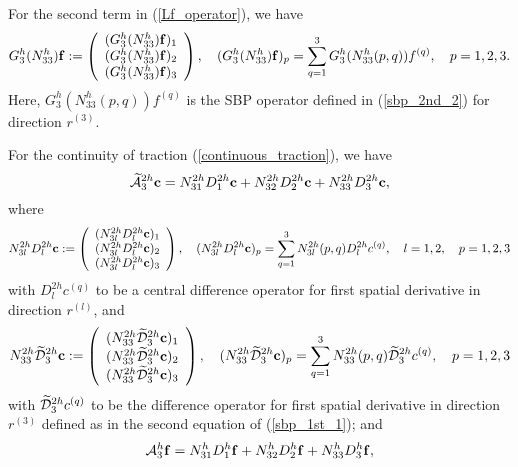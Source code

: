 For the second term in (\ref{Lf_operator}), we have
\begin{align*}\label{3_10_2}
{{G}}_3^{h}({N}_{33}^{h}){\bf f} := \left(\begin{array}{c}
({{G}}_3^{h}({N}_{33}^{h}){\bf f})_1 \\
({{G}}_3^{h}({N}_{33}^{h}){\bf f})_2 \\
({{G}}_3^{h}({N}_{33}^{h}){\bf f})_3 
\end{array}\right), \quad ({{G}}_3^{h}({N}_{33}^{h}){\bf f})_p = \sum_{q = 1}^{3} {G}_3^{h}(N_{33}^{h}(p,q)) {f}^{(q)},\quad p = 1,2,3.
\end{align*}
Here, ${G}_3^{h}(N_{33}^{h}(p,q)) {f}^{(q)}$ is the SBP operator defined in (\ref{sbp_2nd_2}) for direction $r^{(3)}$. 

For the continuity of traction (\ref{continuous_traction}), we have \[\widetilde{\mathcal{A}}^{2h}_3{\bf c} = N_{31}^{2h}D_1^{2h}{\bf c}+N_{32}^{2h}D_2^{2h}{\bf c}+N_{33}^{2h}D_3^{2h}{\bf c},\]
where
\begin{align*}\label{gamma_D} 
{N}_{3l}^{2h}D_l^{2h}{\bf c} := \left(\begin{array}{c}
({N}_{3l}^{2h}D_l^{2h}{\bf c})_1 \\
({N}_{3l}^{2h}D_l^{2h}{\bf c})_2 \\
({N}_{3l}^{2h}D_l^{2h}{\bf c})_3 
\end{array}\right), \quad ({N}_{3l}^{2h}D_l^{2h}{\bf c})_p = \sum_{q = 1}^{3} N_{3l}^{2h}(p,q)D_l^{2h}{c}^{(q)},\quad l = 1,2, \quad p = 1,2,3
\end{align*}
with $D_l^{2h}{c}^{(q)}$ to be a central difference operator for first spatial derivative in direction $r^{(l)}$, and
\begin{align*}\label{3_17}
{N}_{33}^{2h}\wt{\mathcal{D}}_3^{2h}{\bf c} := \left(\begin{array}{c}
({N}_{33}^{2h}\wt{\mathcal{D}}_3^{2h}{\bf c})_1 \\
({N}_{33}^{2h}\wt{\mathcal{D}}_3^{2h}{\bf c})_2 \\
({N}_{33}^{2h}\wt{\mathcal{D}}_3^{2h}{\bf c})_3 
\end{array}\right), \quad ({N}_{33}^{2h}\wt{\mathcal{D}}_3^{2h}{\bf c})_p = \sum_{q = 1}^{3} N_{33}^{2h}(p,q)\wt{\mathcal{D}}_3^{2h}{c}^{(q)},\quad p = 1,2,3
\end{align*}
with $\widetilde{\mathcal{D}}_3^{2h}{c}^{(q)}$ to be the difference operator for first spatial derivative in direction $r^{(3)}$ defined as in the second equation of (\ref{sbp_1st_1}); and 
\[\mathcal{A}_3^h{\bf f} = N_{31}^hD_1^h{\bf f}+N_{32}^hD_2^h{\bf f}+N_{33}^hD_3^h{\bf f},\]
